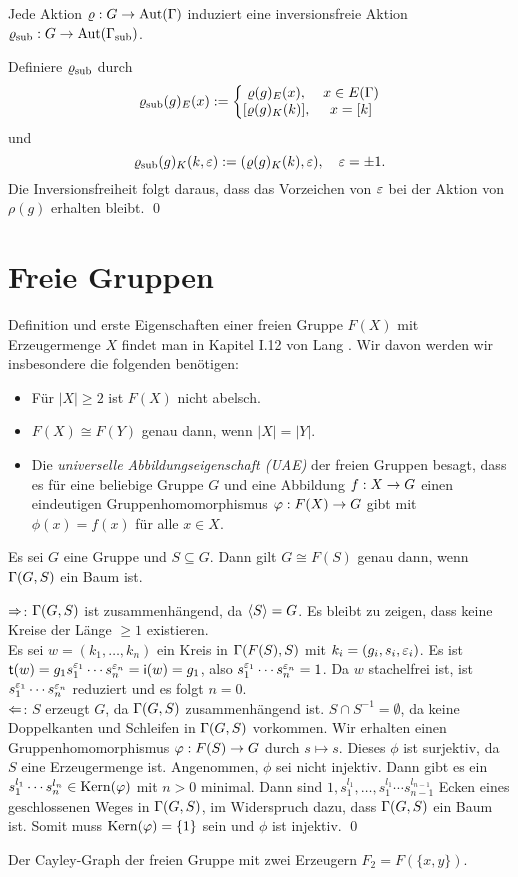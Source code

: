 \BEM Jede Aktion $\varrho:G\rightarrow\mathrm{Aut}(\Gamma)$ induziert eine inversionsfreie
Aktion $\varrho_{\text{sub}}:G\rightarrow\mathrm{Aut}(\Gamma_{\text{sub}})$.

\bew Definiere $\varrho_{\text{sub}}$ durch
\[
\rhosub(g)_E(x) :=
\left\{\begin{matrix}
\rho(g)_E(x), & x\in E(\GR) \\
[\rho(g)_K(k)], & x=[k]
\end{matrix}\right.
\]
und
\[
\varrho_{\text{sub}}(g)_K(k,\varepsilon) :=
(\varrho(g)_K(k),\varepsilon),
\quad \varepsilon=\pm 1.
\]
Die Inversionsfreiheit folgt daraus, dass das Vorzeichen von $\varepsilon$
bei der Aktion von $\rho(g)$ erhalten bleibt.
\qed

\section{Freie Gruppen}\label{sec_FG}

Definition und erste Eigenschaften einer freien Gruppe $F(X)$
mit Erzeugermenge $X$ findet man in Kapitel I.12 von Lang \cite{lang}.
Wir davon werden wir insbesondere die folgenden benötigen:
\begin{itemize}
\item Für $|X|\geq 2$ ist $F(X)$ nicht abelsch.
\item $F(X)\cong F(Y)$ genau dann, wenn $|X|=|Y|$.
\item Die \emph{universelle Abbildungseigenschaft (UAE)}
der freien Gruppen besagt, dass es für eine beliebige Gruppe $G$ und
eine Abbildung $f:X\rightarrow G$ einen eindeutigen Gruppenhomomorphismus
$\varphi:F(X)\rightarrow G$ gibt mit $\phi(x)=f(x)$ für alle $x\in X$.
\end{itemize}

\PROP Es sei $G$ eine Gruppe und $S\subseteq G$. Dann gilt
$G\cong F(S)$ genau dann, wenn $\Gamma(G,S)$ ein Baum ist.

\bew \glqq$\Rightarrow$\grqq:
$\Gamma(G,S)$ ist zusammenhängend, da $\langle S\rangle=G$. Es bleibt zu
zeigen, dass keine Kreise der Länge $\geq 1$ existieren.\\
Es sei $w=(k_1,\ldots,k_n)$ ein Kreis in $\Gamma(F(S),S)$ mit
$k_i=(g_i,s_i,\varepsilon_i)$.
Es ist $\mathsf{t}(w)=g_1 s_1^{\varepsilon_1}\cdots s_n^{\varepsilon_n}
=\mathsf{i}(w)=g_1$, also $s_1^{\varepsilon_1}\cdots s_n^{\varepsilon_n}=1$.
Da $w$ stachelfrei ist, ist $s_1^{\varepsilon_1}\cdots s_n^{\varepsilon_n}$
reduziert und es folgt $n=0$.\\
\glqq$\Leftarrow$\grqq:
$S$ erzeugt $G$, da $\Gamma(G,S)$ zusammenhängend ist.
$S\cap S^{-1}=\emptyset$, da keine Doppelkanten und Schleifen
in $\Gamma(G,S)$ vorkommen. Wir erhalten einen Gruppenhomomorphismus
$\varphi:F(S)\rightarrow G$ durch $s\mapsto s$.
Dieses $\phi$ ist surjektiv, da $S$ eine Erzeugermenge ist.
Angenommen, $\phi$ sei nicht injektiv. Dann gibt es ein
$s_1^{l_1}\cdots s_n^{l_n} \in \mathrm{Kern}(\varphi)$ mit $n>0$ minimal.
Dann sind $1,s_1^{l_1},\ldots,s_1^{l_1}\cdots s_{n-1}^{l_{n-1}}$
Ecken eines geschlossenen Weges in $\Gamma(G,S)$, im Widerspruch dazu,
dass $\Gamma(G,S)$ ein Baum ist. Somit muss $\mathrm{Kern}(\varphi)=\{1\}$ sein
und $\phi$ ist injektiv.
\qed

\BSP Der Cayley-Graph der freien Gruppe mit zwei Erzeugern
$F_2=F(\{x,y\})$.
\begin{center}
\end{center}